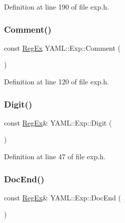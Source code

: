 Definition at line 190 of file exp.\+h.

\mbox{\label{namespace_y_a_m_l_1_1_exp_a039d4627f63ee8bb7b73f3fe268f67d3}} 
\subsubsection{\texorpdfstring{Comment()}{Comment()}}
{\footnotesize\ttfamily const \mbox{\hyperlink{class_y_a_m_l_1_1_reg_ex}{Reg\+Ex}} Y\+A\+M\+L\+::\+Exp\+::\+Comment (\begin{DoxyParamCaption}{ }\end{DoxyParamCaption})\hspace{0.3cm}{\ttfamily [inline]}}



Definition at line 120 of file exp.\+h.

\mbox{\label{namespace_y_a_m_l_1_1_exp_ac8a8777757e3233942106afdc651d57c}} 
\subsubsection{\texorpdfstring{Digit()}{Digit()}}
{\footnotesize\ttfamily const \mbox{\hyperlink{class_y_a_m_l_1_1_reg_ex}{Reg\+Ex}}\& Y\+A\+M\+L\+::\+Exp\+::\+Digit (\begin{DoxyParamCaption}{ }\end{DoxyParamCaption})\hspace{0.3cm}{\ttfamily [inline]}}



Definition at line 47 of file exp.\+h.

\mbox{\label{namespace_y_a_m_l_1_1_exp_a546014afae6b876d82a3d9796cea487c}} 
\subsubsection{\texorpdfstring{DocEnd()}{DocEnd()}}
{\footnotesize\ttfamily const \mbox{\hyperlink{class_y_a_m_l_1_1_reg_ex}{Reg\+Ex}}\& Y\+A\+M\+L\+::\+Exp\+::\+Doc\+End (\begin{DoxyParamCaption}{ }\end{DoxyParamCaption})\hspace{0.3cm}{\ttfamily [inline]}}



